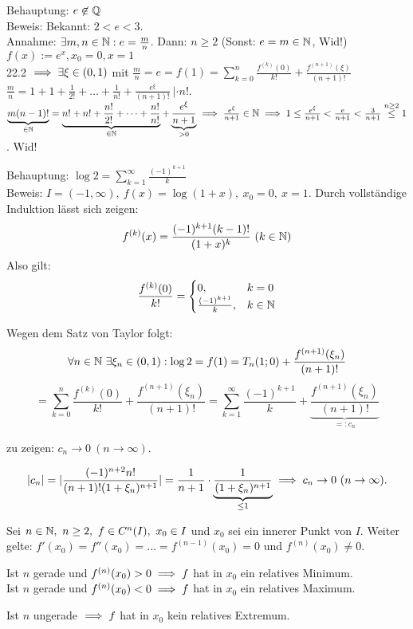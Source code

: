 \documentclass[a4paper,oneside,DIV15,BCOR12mm]{scrbook}
\begin{document}
\begin{beispiele}
\item Behauptung: $e \not\in \mathbb{Q}$ \\
Beweis: Bekannt: $2<e<3$. \\
Annahme: $\exists m,n\in\mathbb{N}: e=\frac{m}{n}$. Dann: $n\ge 2$ (Sonst: $e=m\in\mathbb{N}$, Wid!)\
$f(x):= e^x, x_0 = 0, x=1$ \\
22.2 $\implies \exists \xi \in (0,1)$ mit $\frac{m}{n}=e=f(1)=\sum_{k=0}^n\frac{f^{(k)}(0)}{k!} + \frac{f^{(n+1)}(\xi)}{(n+1)!}$\\
$\frac{m}{n} = 1 + 1+ \frac{1}{2!} + \ldots + \frac{1}{n!} + \frac{e^\xi}{(n+1)!}\  | \cdot n!$. \\
$\underbrace{m(n-1)!}_{\in\mathbb{N}} = \underbrace{n! + n! + \frac{n!}{2!} + \cdots + \frac{n!}{n!}}_{\in \mathbb{N}} + \underbrace{\frac{e^\xi}{n+1}}_{>0} \implies \frac{e^\xi}{n+1} \in \mathbb{N} \implies 1 \le \frac{e^\xi}{n+1} < \frac{e}{n+1} < \frac{3}{n+1} \stackrel{n\ge2}{\le} 1$. Wid!
\item Behauptung: $\log 2 = \sum_{k=1}^{\infty}{\frac{(-1)^{k+1}}{k}}$\\
Beweis: $I = (-1,\infty),\ f(x) = \log(1+x),\ x_0=0,\ x=1.$ Durch vollständige Induktion lässt sich zeigen:
$$f^{(k)}(x) = \frac{(-1)^{k+1}(k-1)!}{(1+x)^k}\ (k\in\MdN)$$
Also gilt:
$$\frac{f^{(k)}(0)}{k!} = \begin{cases}
0,&k=0\\
\frac{(-1)^{k+1}}{k},&k\in\mathbb{N}
\end{cases}$$

Wegen dem Satz von Taylor folgt:
$$\forall n\in\mathbb{N}\ \exists \xi_n\in(0,1): \log 2 = f(1) = T_n(1;0) + \frac{f^{(n+1)}(\xi_n)}{(n+1)!}$$
$$= \sum_{k=0}^{n}{\frac{f^{(k)}(0)}{k!}} + \frac{f^{(n+1)}(\xi_n)}{(n+1)!} = \sum_{k=1}^{\infty}{\frac{(-1)^{k+1}}{k}} + \underbrace{\frac{f^{(n+1)}(\xi_n)}{(n+1)!}}_{=:c_n}$$

zu zeigen: $c_n \to 0\ (n \to \infty).$

$$|c_n| = |\frac{(-1)^{n+2}n!}{(n+1)!(1+\xi_n)^{n+1}}| = \frac{1}{n+1} \cdot \underbrace{\frac{1}{(1+\xi_n)^{n+1}}}_{\le 1} \implies c_n \to 0\ (n \to \infty).$$
\end{beispiele}

\begin{satz}
Sei $n \in \MdN,\ n \ge 2,\ f \in C^n(I),\ x_0 \in I$ und $x_0$ sei ein innerer Punkt von $I$. Weiter gelte: $f'(x_0) = f''(x_0) = \ldots = f^{(n-1)}(x_0) = 0$ und $f^{(n)}(x_0) \ne 0.$
\begin{liste}
\item Ist $n$ gerade und $f^{(n)}(x_0) > 0 \implies f$ hat in $x_0$ ein relatives Minimum.\\
Ist $n$ gerade und $f^{(n)}(x_0) < 0 \implies f$ hat in $x_0$ ein relatives Maximum.
\item Ist $n$ ungerade $\implies f$ hat in $x_0$ kein relatives Extremum.
\end{liste}
\end{satz}
\end{document}
